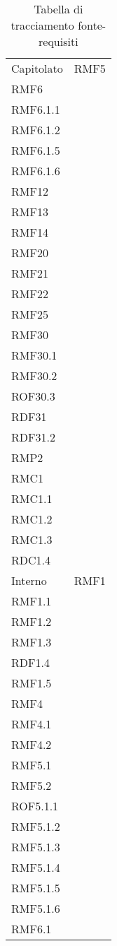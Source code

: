 \setlength{\tabcolsep}{10pt}
\begin{longtable}[h!] { >{\centering}m{5cm} >{\centering}m{5cm} }
	\caption{Tabella di tracciamento fonte-requisiti} \\
	\rowcolor{lightgray}
	\thead{Fonte} & \thead{Requisiti} \\ \endhead%
	
	Capitolato & RMF5 \\
	 RMF6 \\
	 RMF6.1.1\\
	 RMF6.1.2 \\
	 RMF6.1.5 \\
	 RMF6.1.6 \\
	 RMF12 \\
	 RMF13 \\
	 RMF14 \\
	 RMF20 \\
	 RMF21 \\
	 RMF22 \\
	 RMF25 \\
	 RMF30 \\
	 RMF30.1 \\
	 RMF30.2 \\
	 ROF30.3 \\
	 RDF31\\
	 RDF31.2 \\
	 RMP2 \\
	 RMC1 \\
	 RMC1.1 \\
	 RMC1.2 \\
	 RMC1.3 \\
	 RDC1.4
	 \tabularnewline
	 Interno & RMF1 \\
	 RMF1.1 \\
	 RMF1.2 \\
	 RMF1.3 \\
	 RDF1.4 \\
	 RMF1.5 \\
	 RMF4 \\
	 RMF4.1 \\
	 RMF4.2 \\
	 RMF5.1 \\
	 RMF5.2 \\
	 ROF5.1.1 \\
	 RMF5.1.2 \\
	 RMF5.1.3 \\
	 RMF5.1.4 \\
	 RMF5.1.5 \\
	 RMF5.1.6 \\
	 RMF6.1 \\

\end{longtable}
